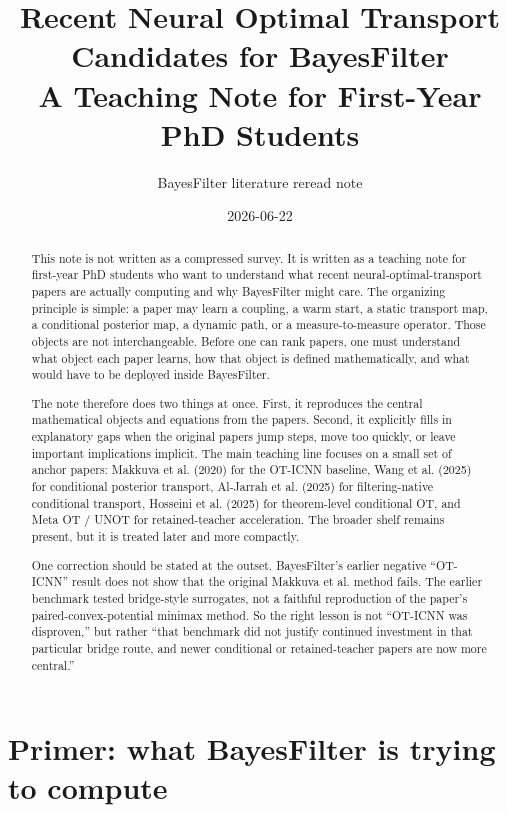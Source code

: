 \documentclass[11pt]{report}
\title{Recent Neural Optimal Transport Candidates for BayesFilter\\
A Teaching Note for First-Year PhD Students}
\author{BayesFilter literature reread note}
\date{2026-06-22}
\begin{document}
\maketitle
\tableofcontents
\clearpage
{}

\begin{abstract}
This note is not written as a compressed survey.  It is written as a teaching
note for first-year PhD students who want to understand what recent
neural-optimal-transport papers are actually computing and why BayesFilter might
care.  The organizing principle is simple: a paper may learn a coupling, a warm
start, a static transport map, a conditional posterior map, a dynamic path, or a
measure-to-measure operator.  Those objects are not interchangeable.  Before one
can rank papers, one must understand what object each paper learns, how that
object is defined mathematically, and what would have to be deployed inside
BayesFilter.

The note therefore does two things at once.  First, it reproduces the central
mathematical objects and equations from the papers.  Second, it explicitly fills
in explanatory gaps when the original papers jump steps, move too quickly, or
leave important implications implicit.  The main teaching line focuses on a small
set of anchor papers: Makkuva et al. (2020) for the OT-ICNN baseline, Wang et
al. (2025) for conditional posterior transport, Al-Jarrah et al. (2025) for
filtering-native conditional transport, Hosseini et al. (2025) for theorem-level
conditional OT, and Meta OT / UNOT for retained-teacher acceleration.  The
broader shelf remains present, but it is treated later and more compactly.

One correction should be stated at the outset.  BayesFilter's earlier negative
``OT-ICNN'' result does not show that the original Makkuva et al. method fails.
The earlier benchmark tested bridge-style surrogates, not a faithful
reproduction of the paper's paired-convex-potential minimax method.  So the
right lesson is not ``OT-ICNN was disproven,'' but rather ``that benchmark did
not justify continued investment in that particular bridge route, and newer
conditional or retained-teacher papers are now more central.''
\end{abstract}

\chapter{Primer: what BayesFilter is trying to compute}
\end{document}
